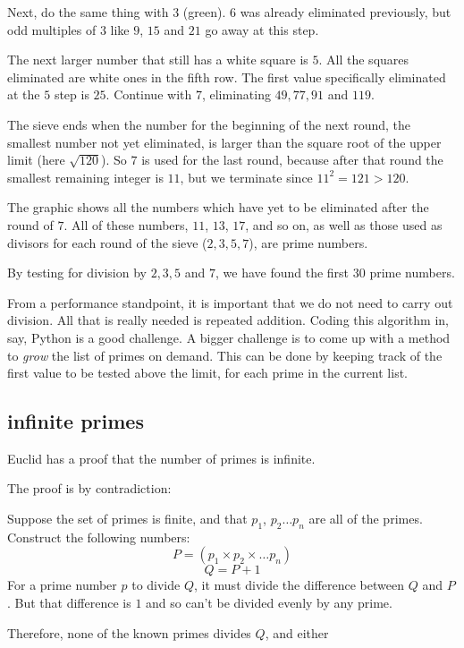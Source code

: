 \documentclass[11pt, oneside]{article}
\begin{document}
Next, do the same thing with $3$ (green).  $6$ was already eliminated previously, but odd multiples of $3$ like $9$, $15$ and $21$ go away at this step.

The next larger number that still has a white square is $5$.  All the squares eliminated are white ones in the fifth row. The first value specifically eliminated at the $5$ step is $25$.  Continue with $7$, eliminating $49, 77, 91$ and $119$.

The sieve ends when the number for the beginning of the next round, the smallest number not yet eliminated, is larger than the square root of the upper limit (here $\sqrt{120}$).  So $7$ is used for the last round, because after that round the smallest remaining integer is $11$, but we terminate since $11^2 = 121 > 120$.

The graphic shows all the numbers which have yet to be eliminated after the round of $7$.   All of these numbers, $11$, $13$, $17$, and so on, as well as those used as divisors for each round of the sieve ($2, 3, 5, 7$), are prime numbers.

By testing for division by $2, 3, 5$ and $7$, we have found the first $30$ prime numbers.

From a performance standpoint, it is important that we do not need to carry out division.  All that is really needed is repeated addition.  Coding this algorithm in, say, Python is a good challenge.  A bigger challenge is to come up with a method to \emph{grow} the list of primes on demand.  This can be done by keeping track of the first value to be tested above the limit, for each prime in the current list.

\subsection*{infinite primes}

Euclid has a proof that the number of primes is infinite.

The proof is by contradiction:

Suppose the set of primes is finite, and that $p_1$, $p_2 \dots p_n$ are all of the primes.  Construct the following numbers:
\[ P = (p_1 \times p_2 \times \dots p_n)  \]
\[ Q = P + 1 \]
For a prime number $p$ to divide $Q$, it must divide the difference between $Q$ and $P$.  But that difference is $1$ and so can't be divided evenly by any prime.

Therefore, none of the known primes divides $Q$, and either
\end{document}
